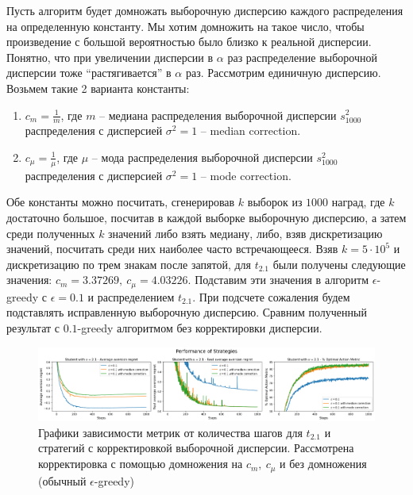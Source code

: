 Пусть алгоритм будет домножать выборочную дисперсию каждого распределения на определенную константу. Мы хотим домножить на такое число, чтобы произведение с большой вероятностью было близко к реальной дисперсии. Понятно, что при увеличении дисперсии в $\alpha$ раз распределение выборочной дисперсии тоже ``растягивается'' в $\alpha$ раз. Рассмотрим единичную дисперсию. Возьмем такие 2 варианта константы:
\begin{enumerate}
    \item $c_m = \frac{1}{m}$, где $m$ -- медиана распределения выборочной дисперсии $s_{1000}^2$ распределения с дисперсией $\sigma^2=1$ -- median correction.
    \item $c_{\mu} = \frac{1}{\mu}$, где $\mu$ -- мода распределения выборочной дисперсии $s_{1000}^2$ распределения с дисперсией $\sigma^2=1$ -- mode correction.
\end{enumerate}
Обе константы можно посчитать, сгенерировав $k$ выборок из $1000$ наград, где $k$ достаточно большое, посчитав в каждой выборке выборочную дисперсию, а затем среди полученных $k$ значений либо взять медиану, либо, взяв дискретизацию значений, посчитать среди них наиболее часто встречающееся. Взяв $k=5\cdot 10^{5}$ и дискретизацию по трем знакам после запятой, для $t_{2.1}$ были получены следующие значения: $c_m = 3.37269, \: c_{\mu} = 4.03226$. Подставим эти значения в алгоритм $\epsilon$-greedy с $\epsilon = 0.1$ и распределением $t_{2.1}$. При подсчете сожаления будем подставлять исправленную выборочную дисперсию. Сравним полученный результат с $0.1$-greedy алгоритмом без корректировки дисперсии.

\begin{figure}[ht!] %
\centering
\includegraphics[width=6in]{theory_tester/theory_images/correction_variance/strat_distr.png}
\caption{Графики зависимости метрик от количества шагов для $t_{2.1}$ и стратегий с корректировкой выборочной дисперсии. Рассмотрена корректировка с помощью домножения на $c_m, \: c_{\mu}$ и без домножения (обычный $\epsilon$-greedy)}
\label{fig:aversion_correction_aversion_strat_distr}
\end{figure}

